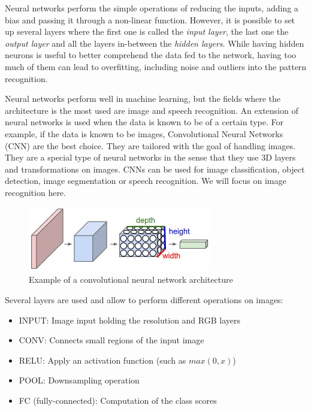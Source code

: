Neural networks perform the simple operations of reducing the inputs, adding a bias and passing it through a non-linear function. However, it is possible to set up several layers where the first one is called the \emph{input layer}, the last one the \emph{output layer} and all the layers in-between the \emph{hidden layers}. While having hidden neurons is useful to better comprehend the data fed to the network, having too much of them can lead to overfitting, including noise and outliers into the pattern recognition.

Neural networks perform well in machine learning, but the fields where the architecture is the most used are image and speech recognition. An extension of neural networks is used when the data is known to be of a certain type. For example, if the data is known to be images, Convolutional Neural Networks (CNN) are the best choice. They are tailored with the goal of handling images. They are a special type of neural networks in the sense that they use 3D layers and transformations on images. CNNs can be used for image classification, object detection, image segmentation or speech recognition. We will focus on image recognition here.

\begin{figure}[htbp]
	\centering
		\includegraphics[width=8cm]{Figures/CNN.png}
	\caption[Convolutional Neural Network Example]{Example of a convolutional neural network architecture \cite{Karpathy2018}}
	\label{fig:CNN}
\end{figure}

Several layers are used and allow to perform different operations on images:
\begin{itemize}
  \item INPUT: Image input holding the resolution and RGB layers
  \item CONV: Connects small regions of the input image
  \item RELU: Apply an activation function (such as $max(0,x)$)
  \item POOL: Downsampling operation
  \item FC (fully-connected): Computation of the class scores
\end{itemize}

